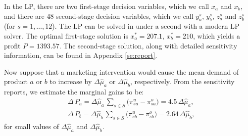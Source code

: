 \documentclass[a4paper,11pt]{article}
\begin{document}
\begin{table}[ht]
\caption{Demand Realisations: Example}
\label{tab:demand}
\centering
{}
\end{table}

\begin{table}[ht]
\caption{Demand Realisations: Statistical Summary}
\label{tab:summary}
\centering
{}
\end{table}

In the LP, there are two first-stage decision variables, which we call $x_a$
and $x_b$, and there are 48 second-stage decision variables, which we call
$y_a^s$, $y_b^s$, $z_a^s$ and $z_b^s$ (for $s = 1, \ldots, 12$). The LP can
be solved in under a second with a modern LP solver. The optimal first-stage
solution is $x_a^*=207.1$, $x_b^*=210$, which yields a profit $P=1393.57$.
The second-stage solution, along with detailed sensitivity information,
can be found in Appendix \ref{se:report}.

Now suppose that a marketing intervention would cause the mean demand of
product $a$ or $b$ to increase by $\Delta \hat{\mu}_a$ or $\Delta \hat{\mu}_b$, respectively. From the sensitivity reports, we estimate
the marginal gains to be:
\[
\begin{aligned}
    &\Delta \, P_a = \Delta \hat{\mu}_a \, \sum_{s \in S} \big( \pi_{sa}^u - \pi_{sa}^o \big) = 4.5 \, \Delta \hat{\mu}_a,\\
    &\Delta \, P_b = \Delta \hat{\mu}_b \, \sum_{s \in S} \big( \pi_{sb}^u - \pi_{sb}^o \big) = 2.64 \, \Delta \hat{\mu}_b,
\end{aligned}
\]
for small values of $\Delta \hat{\mu}_a$ and $\Delta \hat{\mu}_b$.
\end{document}
